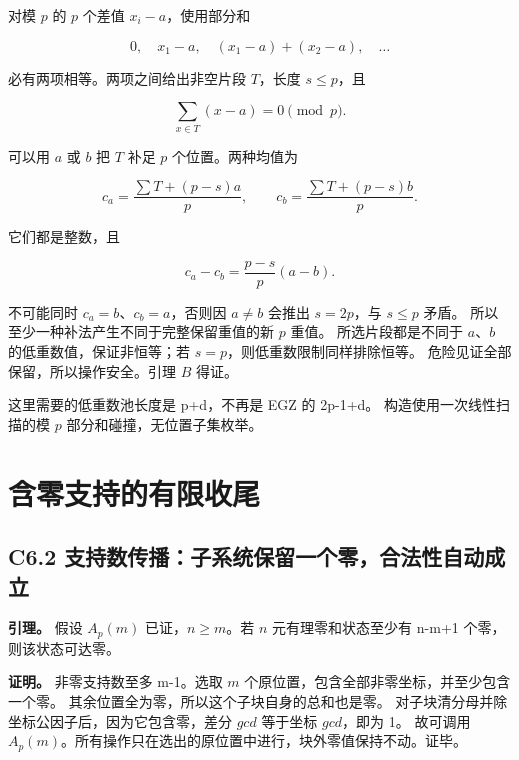 \documentclass[11pt,a4paper]{article}
\theoremstyle{definition}
\numberwithin{equation}{section}
\begin{document}
{对模} {\ensuremath{p}} {的} {\ensuremath{p}} {个差值} {\ensuremath{x_{i}-a}，使用部分和}

\[
0,\quad x_1-a,\quad (x_1-a)+(x_2-a),\quad\ldots
\]

{必有两项相等。两项之间给出非空片段} {\ensuremath{T}，长度} {\ensuremath{s\le p}，且}

\[
\sum_{x\in T}(x-a)=0\pmod p.
\]

{可以用} {\ensuremath{a}} {或} {\ensuremath{b}} {把} {\ensuremath{T}} {补足} {\ensuremath{p}} {个位置。两种均值为}

\[
c_a=\frac{\sum T+(p-s)a}{p},\qquad
c_b=\frac{\sum T+(p-s)b}{p}.
\]

{它们都是整数，且}

\[
c_a-c_b=\frac{p-s}{p}(a-b).
\]

{不可能同时} {\ensuremath{c_{a}=b}、\ensuremath{c_{b}=a}，否则因} {\ensuremath{a\ne b}} {会推出} {\ensuremath{s=2p}，与} {\ensuremath{s\le p}} {矛盾。} {所以至少一种补法产生不同于完整保留重值的新} {\ensuremath{p}} {重值。} {所选片段都是不同于} {\ensuremath{a}、\ensuremath{b}} {的低重数值，保证非恒等；若} {\ensuremath{s=p}，则低重数限制同样排除恒等。} {危险见证全部保留，所以操作安全。引理} {\ensuremath{B}} {得证。}

{这里需要的低重数池长度是} {p+d，不再是} {EGZ} {的} {2p-1+d。} {构造使用一次线性扫描的模} {\ensuremath{p}} {部分和碰撞，无位置子集枚举。}


\section{含零支持的有限收尾}\label{construct:zero-tail}
\subsection*{\texorpdfstring{{C6.2} {支持数传播：子系统保留一个零，合法性自动成立}}{C6.2 支持数传播：子系统保留一个零，合法性自动成立}}\label{C6-h34}

\textbf{{引理。}} {假设} {\ensuremath{A_{p}(m)}} {已证，\ensuremath{n\ge m}。若} {\ensuremath{n}} {元有理零和状态至少有} {n-m+1} {个零，则该状态可达零。}

\textbf{{证明。}} {非零支持数至多} {m-1。选取} {\ensuremath{m}} {个原位置，包含全部非零坐标，并至少包含一个零。} {其余位置全为零，所以这个子块自身的总和也是零。} {对子块清分母并除坐标公因子后，因为它包含零，差分} {\ensuremath{gcd}} {等于坐标} {\ensuremath{gcd}，即为} {1。} {故可调用} {\ensuremath{A_{p}(m)}。所有操作只在选出的原位置中进行，块外零值保持不动。证毕。}
\end{document}
